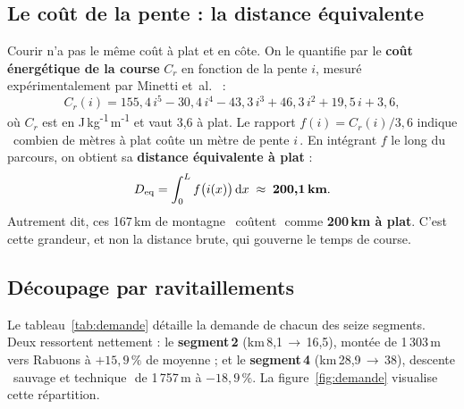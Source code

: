\documentclass{locomotionreport}
\newcommand{\Deq}{D_{\mathrm{eq}}}
\begin{document}
\subsection{Le co\^ut de la pente : la distance \'equivalente}
Courir n'a pas le m\^eme co\^ut \`a plat et en c\^ote. On le quantifie par le \textbf{co\^ut \'energ\'etique de la
course} \(C_r\) en fonction de la pente \(i\), mesur\'e exp\'erimentalement par Minetti et~al.~\cite{minetti2002} :
\begin{equation}
C_r(i) = 155{,}4\,i^5 - 30{,}4\,i^4 - 43{,}3\,i^3 + 46{,}3\,i^2 + 19{,}5\,i + 3{,}6,
\label{eq:minetti}
\end{equation}
o\`u \(C_r\) est en J\,kg\textsuperscript{-1}\,m\textsuperscript{-1} et vaut 3,6 \`a plat. Le rapport \(f(i)=C_r(i)/3{,}6\)
indique \og~combien de m\`etres \`a plat co\^ute un m\`etre de pente \(i\)\,\fg. En int\'egrant \(f\) le long du parcours,
on obtient sa \textbf{distance \'equivalente \`a plat} :
\begin{equation}
\Deq = \int_0^{L} f\big(i(x)\big)\,\mathrm{d}x \;\approx\; \textbf{200,1\,km}.
\label{eq:deq}
\end{equation}
Autrement dit, ces 167\,km de montagne \og~co\^utent\,\fg\ comme \textbf{200\,km \`a plat}. C'est cette grandeur,
et non la distance brute, qui gouverne le temps de course.

\subsection{D\'ecoupage par ravitaillements}
Le tableau~\ref{tab:demande} d\'etaille la demande de chacun des seize segments. Deux ressortent nettement :
le \textbf{segment\,2} (km\,8,1\,\(\rightarrow\)\,16,5), montée de 1\,303\,m vers Rabuons \`a \(+15{,}9\,\%\) de moyenne ;
et le \textbf{segment\,4} (km\,28,9\,\(\rightarrow\)\,38), descente \og~sauvage et technique\,\fg\ de 1\,757\,m \`a
\(-18{,}9\,\%\). La figure~\ref{fig:demande} visualise cette r\'epartition.
\end{document}

